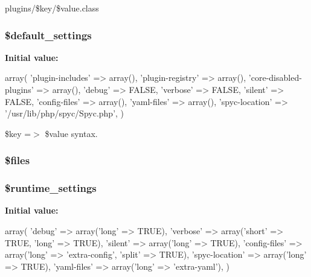 plugins/\$key/\$value.\-class \hypertarget{common_8php_a71d9864ceaa1b925fde0c8ea0f77abc3}{
\subsubsection[{\$default\-\_\-settings}]{\setlength{\rightskip}{0pt plus 5cm}\$default\-\_\-settings}}\label{common_8php_a71d9864ceaa1b925fde0c8ea0f77abc3}
{\bfseries Initial value\-:}
\begin{DoxyCode}
 array(
  \textcolor{stringliteral}{'plugin-includes'} => array(),
  \textcolor{stringliteral}{'plugin-registry'} => array(),
  \textcolor{stringliteral}{'core-disabled-plugins'} => array(),
  \textcolor{stringliteral}{'debug'} => FALSE,
  \textcolor{stringliteral}{'verbose'} => FALSE,
  \textcolor{stringliteral}{'silent'} => FALSE,
  \textcolor{stringliteral}{'config-files'} => array(),
  \textcolor{stringliteral}{'yaml-files'} => array(),
  \textcolor{stringliteral}{'spyc-location'} => \textcolor{stringliteral}{'/usr/lib/php/spyc/Spyc.php'},
)
\end{DoxyCode}
\$key =$>$ \$value syntax. \hypertarget{common_8php_a9590b15215a21e9b42eb546aeef79704}{
\subsubsection[{\$files}]{\setlength{\rightskip}{0pt plus 5cm}\$files}}\label{common_8php_a9590b15215a21e9b42eb546aeef79704}
\hypertarget{common_8php_ab9492937f7a4246d6d6c94cc9688d7e2}{
\subsubsection[{\$runtime\-\_\-settings}]{\setlength{\rightskip}{0pt plus 5cm}\$runtime\-\_\-settings}}\label{common_8php_ab9492937f7a4246d6d6c94cc9688d7e2}
{\bfseries Initial value\-:}
\begin{DoxyCode}
 array(
  \textcolor{stringliteral}{'debug'} => array(\textcolor{stringliteral}{'long'} => TRUE),
  \textcolor{stringliteral}{'verbose'} => array(\textcolor{stringliteral}{'short'} => TRUE, \textcolor{stringliteral}{'long'} => TRUE),
  \textcolor{stringliteral}{'silent'} => array(\textcolor{stringliteral}{'long'} => TRUE),
  \textcolor{stringliteral}{'config-files'} => array(\textcolor{stringliteral}{'long'} => \textcolor{stringliteral}{'extra-config'}, \textcolor{stringliteral}{'split'} => TRUE),
  \textcolor{stringliteral}{'spyc-location'} => array(\textcolor{stringliteral}{'long'} => TRUE),
  \textcolor{stringliteral}{'yaml-files'} => array(\textcolor{stringliteral}{'long'} => \textcolor{stringliteral}{'extra-yaml'}),
)
\end{DoxyCode}
